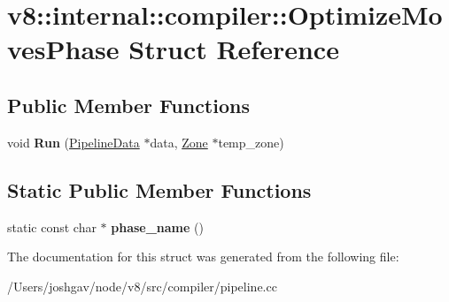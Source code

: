 \hypertarget{structv8_1_1internal_1_1compiler_1_1_optimize_moves_phase}{}\section{v8\+:\+:internal\+:\+:compiler\+:\+:Optimize\+Moves\+Phase Struct Reference}
\label{structv8_1_1internal_1_1compiler_1_1_optimize_moves_phase}
\subsection*{Public Member Functions}
\begin{DoxyCompactItemize}
\item 
void {\bfseries Run} (\hyperlink{classv8_1_1internal_1_1compiler_1_1_pipeline_data}{Pipeline\+Data} $\ast$data, \hyperlink{classv8_1_1internal_1_1_zone}{Zone} $\ast$temp\+\_\+zone)\hypertarget{structv8_1_1internal_1_1compiler_1_1_optimize_moves_phase_aa4881b2a4dbf204a24dd2b95330af77c}{}\label{structv8_1_1internal_1_1compiler_1_1_optimize_moves_phase_aa4881b2a4dbf204a24dd2b95330af77c}

\end{DoxyCompactItemize}
\subsection*{Static Public Member Functions}
\begin{DoxyCompactItemize}
\item 
static const char $\ast$ {\bfseries phase\+\_\+name} ()\hypertarget{structv8_1_1internal_1_1compiler_1_1_optimize_moves_phase_afae1d14fa5da942b409a26e69fa3a222}{}\label{structv8_1_1internal_1_1compiler_1_1_optimize_moves_phase_afae1d14fa5da942b409a26e69fa3a222}

\end{DoxyCompactItemize}


The documentation for this struct was generated from the following file\+:\begin{DoxyCompactItemize}
\item 
/\+Users/joshgav/node/v8/src/compiler/pipeline.\+cc\end{DoxyCompactItemize}
